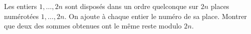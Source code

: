 Les entiers $1, \ldots, 2n$ sont disposés dans un ordre quelconque sur $2n$ places numérotées $1, \ldots, 2n$. On ajoute à chaque entier le numéro de sa place. Montrer que deux des sommes obtenues ont le même reste modulo $2n$.
